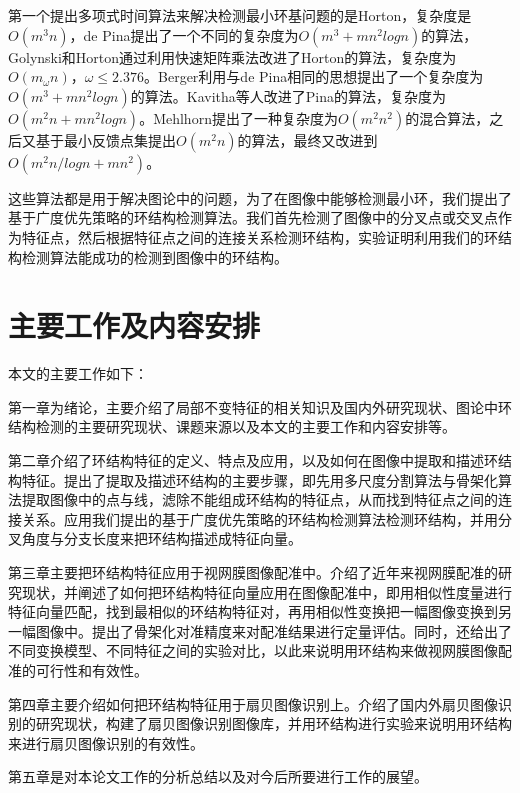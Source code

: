 第一个提出多项式时间算法来解决检测最小环基问题的是Horton\cite{horton}，复杂度是$O(m^3n)$，de Pina\cite{pina}提出了一个不同的复杂度为$O(m^3+mn^2logn)$的算法，Golynski和Horton\cite{golynski}通过利用快速矩阵乘法改进了Horton的算法，复杂度为$O(m_{\omega}n)$，$\omega \le 2.376$。Berger\cite{berger}利用与de Pina相同的思想提出了一个复杂度为$O(m^3+mn^2logn)$的算法。Kavitha\cite{kavitha}等人改进了Pina的算法，复杂度为$O(m^2n+mn^2logn)$。Mehlhorn\cite{mehlhorn}提出了一种复杂度为$O(m^2n^2)$的混合算法，之后又基于最小反馈点集提出$O(m^2n)$的算法，最终又改进到$O(m^2n/logn + mn^2)$。

这些算法都是用于解决图论中的问题，为了在图像中能够检测最小环，我们提出了基于广度优先策略的环结构检测算法。我们首先检测了图像中的分叉点或交叉点作为特征点，然后根据特征点之间的连接关系检测环结构，实验证明利用我们的环结构检测算法能成功的检测到图像中的环结构。




\section{主要工作及内容安排}
\label{sec:bib}

本文的主要工作如下：

第一章为绪论，主要介绍了局部不变特征的相关知识及国内外研究现状、图论中环结构检测的主要研究现状、课题来源以及本文的主要工作和内容安排等。

第二章介绍了环结构特征的定义、特点及应用，以及如何在图像中提取和描述环结构特征。提出了提取及描述环结构的主要步骤，即先用多尺度分割算法与骨架化算法提取图像中的点与线，滤除不能组成环结构的特征点，从而找到特征点之间的连接关系。应用我们提出的基于广度优先策略的环结构检测算法检测环结构，并用分叉角度与分支长度来把环结构描述成特征向量。

第三章主要把环结构特征应用于视网膜图像配准中。介绍了近年来视网膜配准的研究现状，并阐述了如何把环结构特征向量应用在图像配准中，即用相似性度量进行特征向量匹配，找到最相似的环结构特征对，再用相似性变换把一幅图像变换到另一幅图像中。提出了骨架化对准精度来对配准结果进行定量评估。同时，还给出了不同变换模型、不同特征之间的实验对比，以此来说明用环结构来做视网膜图像配准的可行性和有效性。

第四章主要介绍如何把环结构特征用于扇贝图像识别上。介绍了国内外扇贝图像识别的研究现状，构建了扇贝图像识别图像库，并用环结构进行实验来说明用环结构来进行扇贝图像识别的有效性。

第五章是对本论文工作的分析总结以及对今后所要进行工作的展望。
